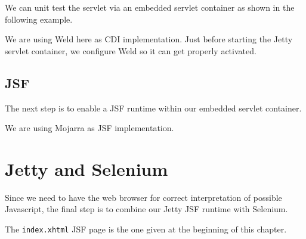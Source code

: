 We can unit test the servlet via an embedded servlet container as shown in the following example.

We are using Weld here as CDI implementation.
Just before starting the Jetty servlet container, we configure Weld so it can get properly activated.

\subsection{JSF}

The next step is to enable a JSF runtime within our embedded servlet container.

We are using Mojarra as JSF implementation.

\section{Jetty and Selenium}
Since we need to have the web browser for correct interpretation of possible Javascript, the final step is to combine our Jetty JSF runtime with Selenium.

The \texttt{index.xhtml} JSF page is the one given at the beginning of this chapter.